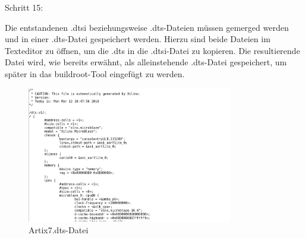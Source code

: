 Schritt 15:

Die entstandenen .dtsi beziehungsweise .dts-Dateien müssen gemerged werden und in einer .dts-Datei gespeichert werden.
Hierzu sind beide Dateien im Texteditor zu öffnen, um die .dts
 in die .dtsi-Datei zu kopieren.
 Die resultierende Datei wird, wie bereits erwähnt, als alleinstehende .dts-Datei gespeichert, um später in das buildroot-Tool eingefügt zu werden.

\begin{figure}[H]
\centering
\includegraphics[width=0.8\textwidth]{Hauptteil/Schritt15.png}
\caption{Artix7.dts-Datei}
\label{fig:mbschritt15}
\end{figure}
%
%
%
%
%
%
